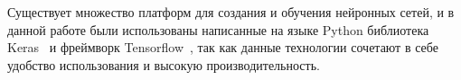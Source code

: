Существует множество платформ для создания и обучения нейронных сетей, и в данной работе были использованы написанные на языке Python библиотека Keras~\cite{chollet2015keras} и фреймворк Tensorflow~\cite{tensorflow2015-whitepaper}, так как данные технологии сочетают в себе удобство использования и высокую производительность.
